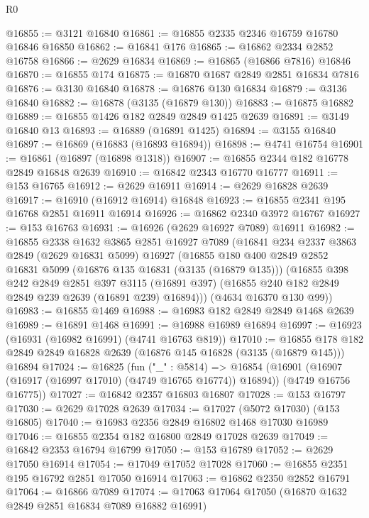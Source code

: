 \begin{lexlean}{R0}
\begin{coremodule}
@16855 := @3121 @16840
@16861 := @16855 @2335 @2346 @16759 @16780 @16846 @16850
@16862 := @16841 @176
@16865 := @16862 @2334 @2852 @16758
@16866 := @2629 @16834
@16869 := @16865 (@16866 @7816) @16846
@16870 := @16855 @174
@16875 := @16870 @1687 @2849 @2851 @16834 @7816
@16876 := @3130 @16840
@16878 := @16876 @130 @16834
@16879 := @3136 @16840
@16882 := @16878 (@3135 (@16879 @130))
@16883 := @16875 @16882
@16889 := @16855 @1426 @182 @2849 @2849 @1425 @2639
@16891 := @3149 @16840 @13
@16893 := @16889 (@16891 @1425)
@16894 := @3155 @16840
@16897 := @16869 (@16883 (@16893 @16894))
@16898 := @4741 @16754
@16901 := @16861 (@16897 (@16898 @1318))
@16907 := @16855 @2344 @182 @16778 @2849 @16848 @2639
@16910 := @16842 @2343 @16770 @16777
@16911 := @153 @16765
@16912 := @2629 @16911
@16914 := @2629 @16828 @2639
@16917 := @16910 (@16912 @16914) @16848
@16923 := @16855 @2341 @195 @16768 @2851 @16911 @16914
@16926 := @16862 @2340 @3972 @16767
@16927 := @153 @16763
@16931 := @16926 (@2629 @16927 @7089) @16911
@16982 := @16855
    @2338
    @1632
    @3865
    @2851
    @16927
    @7089
    (@16841
      @234
      @2337
      @3863
      @2849
      (@2629 @16831 @5099)
      @16927
      (@16855
        @180
        @400
        @2849
        @2852
        @16831
        @5099
        (@16876 @135 @16831 (@3135 (@16879 @135)))
        (@16855
          @398
          @242
          @2849
          @2851
          @397
          @3115
          (@16891 @397)
          (@16855 @240 @182 @2849 @2849 @239 @2639 (@16891 @239) @16894)))
      (@4634 @16370 @130 @99))
@16983 := @16855 @1469
@16988 := @16983 @182 @2849 @2849 @1468 @2639
@16989 := @16891 @1468
@16991 := @16988 @16989 @16894
@16997 := @16923 (@16931 (@16982 @16991) (@4741 @16763 @819))
@17010 := @16855
    @178
    @182
    @2849
    @2849
    @16828
    @2639
    (@16876 @145 @16828 (@3135 (@16879 @145)))
    @16894
@17024 := @16825
    (fun ("_" : @5814) =>
    @16854
      (@16901 (@16907 (@16917 (@16997 @17010) (@4749 @16765 @16774)) @16894))
      (@4749 @16756 @16775))
@17027 := @16842 @2357 @16803 @16807
@17028 := @153 @16797
@17030 := @2629 @17028 @2639
@17034 := @17027 (@5072 @17030) (@153 @16805)
@17040 := @16983 @2356 @2849 @16802 @1468 @17030 @16989
@17046 := @16855 @2354 @182 @16800 @2849 @17028 @2639
@17049 := @16842 @2353 @16794 @16799
@17050 := @153 @16789
@17052 := @2629 @17050 @16914
@17054 := @17049 @17052 @17028
@17060 := @16855 @2351 @195 @16792 @2851 @17050 @16914
@17063 := @16862 @2350 @2852 @16791
@17064 := @16866 @7089
@17074 := @17063 @17064 @17050 (@16870 @1632 @2849 @2851 @16834 @7089 @16882 @16991)

\end{coremodule}
\end{lexlean}
